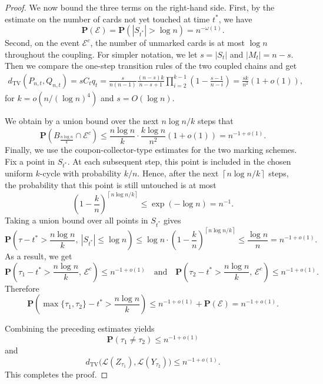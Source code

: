 \begin{proof}
    We now bound the three terms on the right-hand side. First, by the estimate
    on the number of cards not yet touched at time $t^*$, we have
    \begin{equation}\label{eq: St small}
        \mathbf P(\mathcal E)=\mathbf P(|S_{t^*}|>\log n)=n^{-\omega(1)}.
    \end{equation}
    Second, on the event $\mathcal E^c$, the number of unmarked cards is at most
    $\log n$ throughout the coupling. For simpler notation, we let \(s = |S_t|\) and \(|M_t| = n-s\). 
Then we compare the one-step transition rules of the two coupled chains and get
\begin{equation}
\begin{aligned}
d_{\mathrm{TV}}\!\left(P_{n,t},Q_{n,t}\right)= s C_t q_t 
= \frac{s}{n(n-1)}
   \frac{(n-s)k}{n-s+1}
   \prod_{i=2}^{k-1}
   \left(1-\frac{s-1}{n-i}\right) = \frac{sk}{n^2}\left(1+o(1)\right),
\end{aligned}
\tag{3.16}
\end{equation}
for \(k=o\!\left(n/(\log n)^4\right)\) and \(s=O(\log n)\).
    
We obtain by a union bound over the next
    $n\log n/k$ steps that
    $$
    \mathbf P\left(B_{\frac{n\log n}{k}}\cap \mathcal E^c\right)
    \leq
    \frac{n\log n}{k}\cdot
    \frac{k\log n}{n^2}(1+o(1))
    =
    n^{-1+o(1)}.
    $$
    Finally, we use the coupon-collector-type estimates for the two marking schemes. Fix a point in $S_{t^*}$. At each
subsequent step, this point is included in the chosen uniform $k$-cycle with probability $k/n$.
Hence, after the next $\left\lceil n\log n/k\right\rceil$ steps, the probability that this point
is still untouched is at most
\begin{equation}
    \left(1-\frac{k}{n}\right)^{\left\lceil n\log n/k\right\rceil}
    \leq \exp(-\log n)
    = n^{-1}.
\end{equation}
Taking a union bound over all points in $S_{t^*}$ gives
\begin{equation}\label{eq: coupon}
    \mathbf P\left(\tau-t^*>\frac{n\log n}{k},\ |S_{t^*}|\leq \log n\right)\leq\log n\cdot\left(1-\frac{k}{n}\right)^{\left\lceil n\log n/k\right\rceil}\leq\frac{\log n}{n}
    = n^{-1+o(1)}.
\end{equation}
As a result, we get
    $$
    \mathbf P\left(
    \tau_1-t^*>\frac{n\log n}{k},\,\mathcal E^c
    \right)
    \leq n^{-1+o(1)}\quad \text{and} \quad
    \mathbf P\left(
    \tau_2-t^*>\frac{n\log n}{k},\,\mathcal E^c
    \right)
    \leq n^{-1+o(1)}.
    $$
    Therefore
    $$
    \mathbf P\left(
    \max\{\tau_1,\tau_2\}-t^*>\frac{n\log n}{k}
    \right)
    \leq
    n^{-1+o(1)}+\mathbf P(\mathcal E)
    =
    n^{-1+o(1)}.
    $$

    Combining the preceding estimates yields
    $$
    \mathbf P(\tau_1\neq \tau_2)\leq n^{-1+o(1)}
    $$
    and
    $$
    d_{\mathrm{TV}}\bigl(\mathcal L(Z_{\tau_1}),\mathcal L(Y_{\tau_2})\bigr)
    \leq n^{-1+o(1)}.
    $$
    This completes the proof.
\end{proof}

